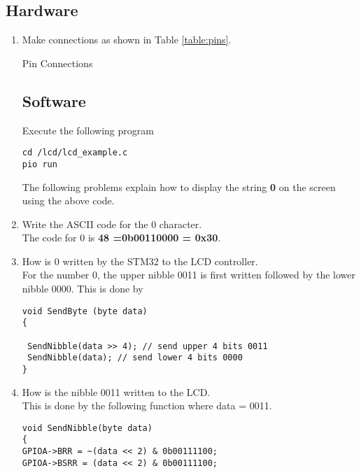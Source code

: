 \documentclass[journal,12pt,twocolumn]{IEEEtran}
\renewcommand\thesection{\arabic{section}}
\renewcommand\thesubsection{\thesection.\arabic{subsection}}
\begin{document}
\subsection{Hardware}
\renewcommand{\theequation}{\theenumi}
\renewcommand{\thefigure}{\theenumi}
\begin{enumerate}[label=\thesubsection.\arabic*.,ref=\thesubsection.\theenumi]
\item Make connections as shown in Table \ref{table:pins}.
\begin{table}[!h]
\footnotesize

\caption{Pin Connections}
\label{table:pins}
\end{table}
\subsection{Software}
Execute the following program
\begin{lstlisting}
cd /lcd/lcd_example.c
pio run
\end{lstlisting}
The following problems explain how to display the string \textbf{0} on the screen using
the above code.
\item Write the ASCII code for the 0 character.
\\
\solution The code for 0 is \textbf{48 =0b00110000 = 0x30}.
\\
\item How is 0 written by the STM32 to the LCD controller.
\\
\solution For the number 0, the upper nibble 0011 is first written followed by the lower nibble 0000.
This is done by
\begin{lstlisting}
void SendByte (byte data)
{

 SendNibble(data >> 4); // send upper 4 bits 0011
 SendNibble(data); // send lower 4 bits 0000
}
\end{lstlisting}
\item How is the nibble 0011 written to the LCD.
\\
\solution This is done by the following function where data = 0011.
\begin{lstlisting}
void SendNibble(byte data)
{
GPIOA->BRR = ~(data << 2) & 0b00111100;
GPIOA->BSRR = (data << 2) & 0b00111100;
 

\end{lstlisting}
\end{enumerate}
\end{document}
